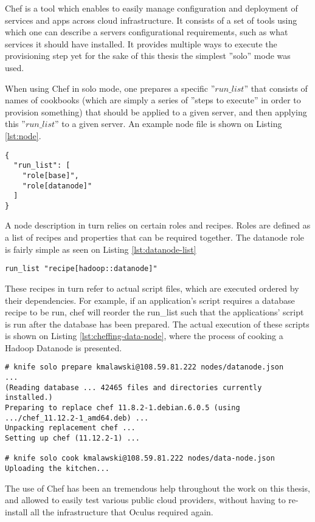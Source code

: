 Chef is a tool which enables to easily manage configuration and deployment of services and apps across cloud infrastructure. It consists of a set of tools using which one can describe a servers configurational requirements, such as what services it should have installed. It provides multiple ways to execute the provisioning step yet for the sake of this thesis the simplest ''solo'' mode was used. 

When using Chef in solo mode, one prepares a specific ''$run\_list$'' that consists of names of cookbooks (which are simply a series of ''steps to execute'' in order to provision something) that should be applied to a given server, and then applying this ''$run\_list$'' to a given server. An example node file is shown on Listing \ref{lst:node}.

\begin{lstlisting}[caption={Example data-node.json file}]
{
  "run_list": [
    "role[base]",
    "role[datanode]"
  ]
}
\end{lstlisting}

A node description in turn relies on certain roles and recipes. Roles are defined as a list of recipes and properties that can be required together. The datanode role is fairly simple as seen on Listing \ref{lst:datanode-list}

\begin{lstlisting}[caption={Example roles/datanode.rb file}]
run_list "recipe[hadoop::datanode]"
\end{lstlisting}

These recipes in turn refer to actual script files, which are executed ordered by their dependencies. For example, if an application's script requires a database recipe to be run, chef will reorder the run\_list such that the applications' script is run after the database has been prepared. The actual execution of these scripts is shown on Listing \ref{lst:cheffing-data-node}, where the process of cooking a Hadoop Datanode is presented.

\begin{lstlisting}[caption={Preparing and Cooking a server with in order to prepare it for becoming a Hadoop data-node},label={lst:cheffing-data-node}]
# knife solo prepare kmalawski@108.59.81.222 nodes/datanode.json
...
(Reading database ... 42465 files and directories currently installed.)
Preparing to replace chef 11.8.2-1.debian.6.0.5 (using .../chef_11.12.2-1_amd64.deb) ...
Unpacking replacement chef ...
Setting up chef (11.12.2-1) ...

# knife solo cook kmalawski@108.59.81.222 nodes/data-node.json
Uploading the kitchen...

\end{lstlisting}

The use of Chef has been an tremendous help throughout the work on this thesis, and allowed to easily test various public cloud providers, without having to re-install all the infrastructure that Oculus required again.












